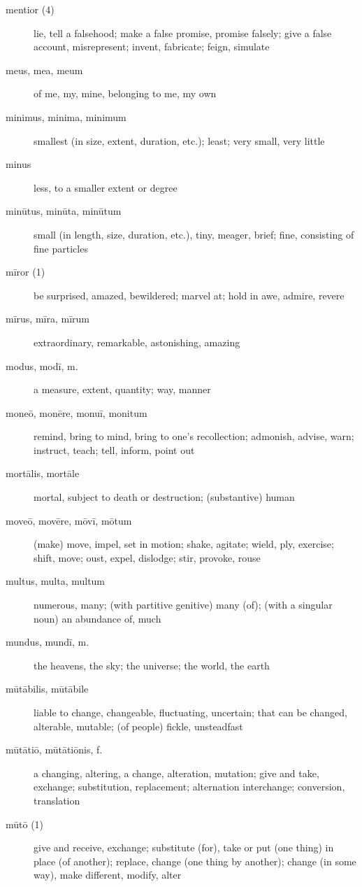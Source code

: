 \begin{description}
    \item[mentior (4)] lie, tell a falsehood; make a false promise, promise falsely; give a false account, misrepresent; invent, fabricate; feign, simulate
    \item[meus, mea, meum] \marginnote{*}of me, my, mine, belonging to me, my own
    \item[minimus, minima, minimum] \marginnote{*}smallest (in size, extent, duration, etc.); least; very small, very little
    \item[minus] \marginnote{*}less, to a smaller extent or degree
    \item[minūtus, minūta, minūtum] small (in length, size, duration, etc.), tiny, meager, brief; fine, consisting of fine particles
    \item[mīror (1)] \marginnote{*}be surprised, amazed, bewildered; marvel at; hold in awe, admire, revere
    \item[mīrus, mīra, mīrum] extraordinary, remarkable, astonishing, amazing
    \item[modus, modī, m.] \marginnote{*}a measure, extent, quantity; way, manner
    \item[moneō, monēre, monuī, monitum] remind, bring to mind, bring to one's recollection; admonish, advise, warn; instruct, teach; tell, inform, point out
    \item[mortālis, mortāle] mortal, subject to death or destruction; (substantive) human 
    \item[moveō, movēre, mōvī, mōtum] \marginnote{*}(make) move, impel, set in motion; shake, agitate; wield, ply, exercise; shift, move; oust, expel, dislodge; stir, provoke, rouse
    \item[multus, multa, multum] \marginnote{*}numerous, many; (with partitive genitive) many (of); (with a singular noun) an abundance of, much
    \item[mundus, mundī, m.] \marginnote{*}the heavens, the sky; the universe; the world, the earth
    \item[mūtābilis, mūtābile] liable to change, changeable, fluctuating, uncertain; that can be changed, alterable, mutable; (of people) fickle, unsteadfast
    \item[mūtātiō, mūtātiōnis, f.] a changing, altering, a change, alteration, mutation; give and take, exchange; substitution, replacement; alternation interchange; conversion, translation
    \item[mūtō (1)] \marginnote{*}give and receive, exchange; substitute (for), take or put (one thing) in place (of another); replace, change (one thing by another); change (in some way), make different, modify, alter

\end{description}
